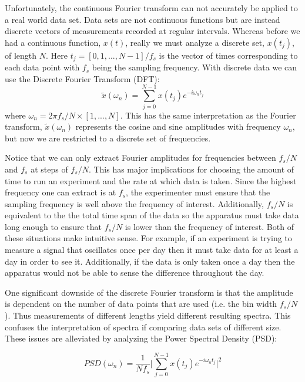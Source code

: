 \documentclass{book}
\begin{document}
Unfortunately, the continuous Fourier transform can not accurately be applied to a real world data set. Data sets are not continuous functions but are instead discrete vectors of measurements recorded at regular intervals. Whereas before we had a continuous function, $x(t)$, really we must analyze a discrete set, $x(t_j)$, of length $N$. Here $t_j= [0, 1, ..., N-1]/f_s$ is the vector of times corresponding to each data point with $f_s$ being the sampling frequency. With discrete data we can use the Discrete Fourier Transform (DFT):
\begin{equation}
\tilde x (\omega_n) = \sum_{j=0}^{N-1} x(t_j) e^{-i \omega_n t_j} \label{DFT}
\end{equation}
where $\omega_n= 2\pi f_s/N \times [1, ..., N]$. This has the same interpretation as the Fourier transform, $\tilde x (\omega_n)$ represents the cosine and sine amplitudes with frequency $\omega_n$, but now we are restricted to a discrete set of frequencies. 


Notice that we can only extract Fourier amplitudes for frequencies between $f_s/N$ and $f_s$ at steps of $f_s/N$. This has major implications for choosing the amount of time to run an experiment and the rate at which data is taken. Since the highest frequency one can extract is at $f_s$, the experimenter must ensure that the sampling frequency is well above the frequency of interest. Additionally, $f_s/N$ is equivalent to the the total time span of the data so the apparatus must take data long enough to ensure that $f_s/N$ is lower than the frequency of interest. Both of these situations make intuitive sense. For example, if an experiment is trying to measure a signal that oscillates once per day then it must take data for at least a day in order to see it. Additionally, if the data is only taken once a day then the apparatus would not be able to sense the difference throughout the day.

One significant downside of the discrete Fourier transform is that the amplitude is dependent on the number of data points that are used (i.e. the bin width $f_s/N$). Thus measurements of different lengths yield different resulting spectra. This confuses the interpretation of spectra if comparing data sets of different size. These issues are alleviated by analyzing the Power Spectral Density (PSD):

\begin{equation}
PSD (\omega_n) = \frac{1}{N f_s} \bigg| \sum_{j=0}^{N-1} x(t_j) e^{-i \omega_n t_j} \bigg|^2 \label{PSD}
\end{equation}
\end{document}

